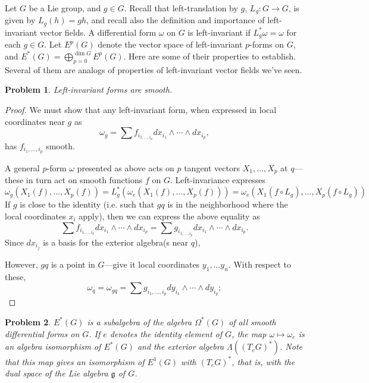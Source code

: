 \documentclass{article}
\newtheorem{plm}{Problem}
\begin{document}
Let $G$ be a Lie group, and $g \in G$.
Recall that left-translation by $g$, $L_{g}: G \to G$, is given by $L_{g}(h) = gh$,
and recall also the definition and importance of left-invariant vector fields.
A differential form $\omega$ on $G$ is left-invariant if $L_{g}^{*}\omega = \omega$ for each $g \in G$.
Let $E^{p}(G)$ denote the vector space of left-invariant $p$-forms on $G$, and $E^{*}(G) = \bigoplus_{p = 0}^{\dim G}E^{p}(G)$.
Here are some of their properties to establish.
Several of them are analogs of properties of left-invariant vector fields we've seen.

\begin{plm}
  Left-invariant forms are smooth.
\end{plm}

\begin{proof}
  We must show that any left-invariant form, when expressed in local coordinates near $g$ as
  \[
    \omega_{g} = \sum f_{i_{1, \ldots, i_{p}}}dx_{i_{1}} \wedge \cdots \wedge dx_{i_{p}},
  \]
  has $f_{i_{1}, \ldots, i_{p}}$ smooth.

  A general $p$-form $\omega$ presented as above acts on $p$ tangent vectors $X_{1}, \ldots, X_{p}$ at $q$---these
  in turn act on smooth functions $f$ on $G$.
  Left-invariance expresses
  \[
    \omega_{g}(X_{1}(f), \ldots, X_{p}(f)) = L_{g}^{*}(\omega_{e}(X_{1}(f), \ldots, X_{p}(f)))
    = \omega_{e}(X_{1}(f \circ L_{g}), \ldots, X_{p}(f \circ L_{g}))
  \]
  If $g$ is close to the identity (i.e. such that $gq$ is in the neighborhood where the local coordinates $x_{i}$ apply),
  then we can express the above equality as
  \[
    \sum f_{i_{1, \ldots, i_{p}}}dx_{i_{1}} \wedge \cdots \wedge dx_{i_{p}}
    = \sum g_{i_{1, \ldots, i_{p}}}dx_{i_{1}} \wedge \cdots \wedge dx_{i_{p}}.
  \]
  Since $dx_{i_{j}}$ is a basis for the exterior algebra(s near $q$),
  
  However, $gq$ is a point in $G$---give it local coordinates $y_{1}, \ldots y_{n}$.
  With respect to these,
  \[
    \omega_{q} = \omega_{gq} = \sum g_{i_{1}, \ldots, i_{p}} dy_{i_{1}} \wedge \cdots \wedge dy_{i_{p}};
  \]

\end{proof}

\begin{plm}
  $E^{*}(G)$ is a subalgebra of the algebra $\Omega^{*}(G)$ of all smooth differential forms on $G$.
  If $e$ denotes the identity element of $G$, the map $\omega \mapsto \omega_{e}$ is an algebra isomorphism of $E^{*}(G)$
  and the exterior algebra $\Lambda((T_{e}G)^{*})$.
  Note that this map gives an isomorphism of $E^{1}(G)$ with $(T_{e}G)^{*}$, that is, with the dual space of the Lie algebra $\mathfrak{g}$
  of $G$.
\end{plm}
\end{document}
